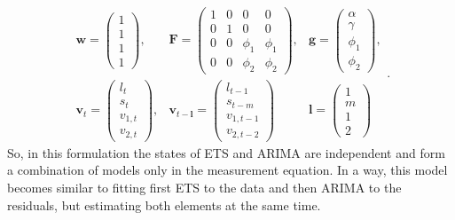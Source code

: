 \documentclass[
]{book}
\theoremstyle{definition}
\theoremstyle{definition}
\theoremstyle{definition}
\theoremstyle{definition}
\theoremstyle{remark}
\begin{document}
\begin{equation}
  \begin{aligned}
    \mathbf{w} = \begin{pmatrix} 1 \\ 1 \\ 1 \\ 1 \end{pmatrix}, & \mathbf{F} = \begin{pmatrix} 1 & 0 & 0 & 0 \\ 0 & 1 & 0 & 0 \\ 0 & 0 & \phi_1 & \phi_1 \\ 0 & 0 & \phi_2 & \phi_2 \end{pmatrix}, & \mathbf{g} = \begin{pmatrix} \alpha \\ \gamma \\ \phi_1 \\ \phi_2 \end{pmatrix}, \\
    \mathbf{v}_{t} = \begin{pmatrix} l_t \\ s_t \\ v_{1,t} \\ v_{2,t} \end{pmatrix}, & \mathbf{v}_{t-\mathbf{l}} = \begin{pmatrix} l_{t-1} \\ s_{t-m} \\ v_{1,t-1} \\ v_{2,t-2} \end{pmatrix} & \mathbf{l} = \begin{pmatrix} 1 \\ m \\ 1 \\ 2\end{pmatrix}
  \end{aligned}.
  \label{eq:ADAMETSARIMAANN100Matrices}
\end{equation}
So, in this formulation the states of ETS and ARIMA are independent and form a combination of models only in the measurement equation. In a way, this model becomes similar to fitting first ETS to the data and then ARIMA to the residuals, but estimating both elements at the same time.
\end{document}
